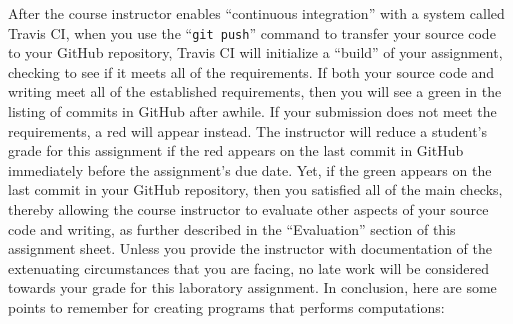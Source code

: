 \documentclass[11pt]{article}
\newcommand{\gitpush}{\command{git push}}
\newcommand{\command}[1]{``\lstinline{#1}''}
\newcommand{\step}[1]{``{#1}''}
\newcommand{\checkmark}{\ding{51}}
\newcommand{\naughtmark}{\ding{55}}
\begin{document}
After the course instructor enables \step{continuous integration} with a system called Travis CI, when you use the
\gitpush{} command to transfer your source code to your GitHub repository, Travis CI will initialize a \step{build} of
your assignment, checking to see if it meets all of the requirements. If both your source code and writing meet all of
the established requirements, then you will see a green \checkmark{} in the listing of commits in GitHub after awhile.
If your submission does not meet the requirements, a red \naughtmark{} will appear instead. The instructor will reduce a
student's grade for this assignment if the red \naughtmark{} appears on the last commit in GitHub immediately before the
assignment's due date. Yet, if the green \checkmark{} appears on the last commit in your GitHub repository, then you
satisfied all of the main checks, thereby allowing the course instructor to evaluate other aspects of your source code
and writing, as further described in the \step{Evaluation} section of this assignment sheet. Unless you provide the
instructor with documentation of the extenuating circumstances that you are facing, no late work will be considered
towards your grade for this laboratory assignment. In conclusion, here are some points to remember for creating programs
that performs computations:
\end{document}
